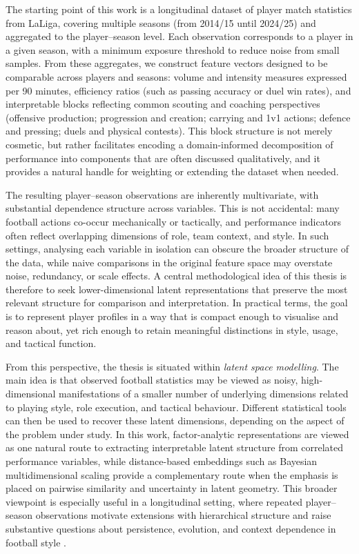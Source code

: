 \documentclass{fmetfm}
\begin{document}
The starting point of this work is a longitudinal dataset of player match statistics from LaLiga, covering multiple seasons (from 2014/15 until 2024/25) and aggregated to the player--season level. Each observation corresponds to a player in a given season, with a minimum exposure threshold to reduce noise from small samples. From these aggregates, we construct feature vectors designed to be comparable across players and seasons: volume and intensity measures expressed per 90 minutes, efficiency ratios (such as passing accuracy or duel win rates), and interpretable blocks reflecting common scouting and coaching perspectives (offensive production; progression and creation; carrying and 1v1 actions; defence and pressing; duels and physical contests). This block structure is not merely cosmetic, but rather facilitates encoding a domain-informed decomposition of performance into components that are often discussed qualitatively, and it provides a natural handle for weighting or extending the dataset when needed.

The resulting player--season observations are inherently multivariate, with substantial dependence structure across variables. This is not accidental: many football actions co-occur mechanically or tactically, and performance indicators often reflect overlapping dimensions of role, team context, and style. In such settings, analysing each variable in isolation can obscure the broader structure of the data, while naive comparisons in the original feature space may overstate noise, redundancy, or scale effects. A central methodological idea of this thesis is therefore to seek lower-dimensional latent representations that preserve the most relevant structure for comparison and interpretation. In practical terms, the goal is to represent player profiles in a way that is compact enough to visualise and reason about, yet rich enough to retain meaningful distinctions in style, usage, and tactical function.

From this perspective, the thesis is situated within \emph{latent space modelling}. The main idea is that observed football statistics may be viewed as noisy, high-dimensional manifestations of a smaller number of underlying dimensions related to playing style, role execution, and tactical behaviour. Different statistical tools can then be used to recover these latent dimensions, depending on the aspect of the problem under study. In this work, factor-analytic representations are viewed as one natural route to extracting interpretable latent structure from correlated performance variables, while distance-based embeddings such as Bayesian multidimensional scaling \cite{oh2001bayesian} provide a complementary route when the emphasis is placed on pairwise similarity and uncertainty in latent geometry. This broader viewpoint is especially useful in a longitudinal setting, where repeated player--season observations motivate extensions with hierarchical structure and raise substantive questions about persistence, evolution, and context dependence in football style \cite{yanchenko2020hierarchical}.
\end{document}
